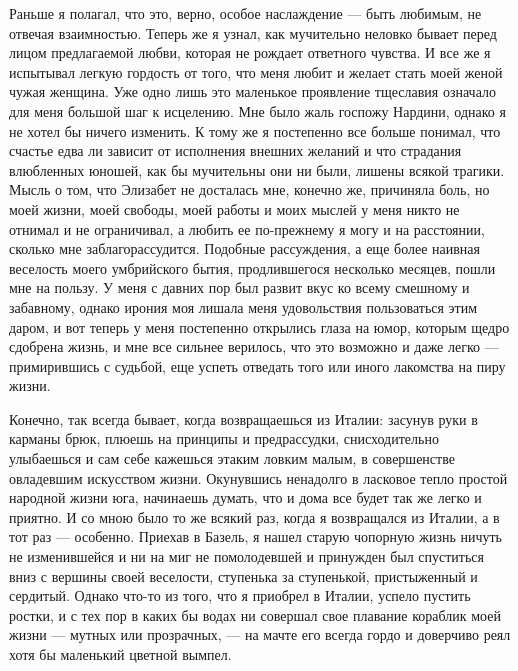 Раньше я полагал, что это, верно, особое наслаждение --- быть любимым,
не  отвечая взаимностью.  Теперь же  я узнал,  как мучительно  неловко
бывает перед  лицом предлагаемой  любви, которая не  рождает ответного
чувства. И все же я испытывал  легкую гордость от того, что меня любит
и желает стать  моей женой чужая женщина. Уже одно  лишь это маленькое
проявление тщеславия  означало для меня  большой шаг к  исцелению. Мне
было жаль  госпожу Нардини, однако  я не  хотел бы ничего  изменить. К
тому же я  постепенно все больше понимал, что счастье  едва ли зависит
от исполнения внешних  желаний и что страдания  влюбленных юношей, как
бы мучительны  они ни были,  лишены всякой  трагики. Мысль о  том, что
Элизабет не досталась мне, конечно  же, причиняла боль, но моей жизни,
моей свободы, моей работы  и моих мыслей у меня никто  не отнимал и не
ограничивал, а любить  ее по-прежнему я могу и  на расстоянии, сколько
мне  заблагорассудится.  Подобные  рассуждения, а  еще  более  наивная
веселость  моего умбрийского  бытия, продлившегося  несколько месяцев,
пошли мне  на пользу.  У меня с  давних пор был  развит вкус  ко всему
смешному  и  забавному, однако  ирония  моя  лишала меня  удовольствия
пользоваться  этим даром,  и вот  теперь у  меня постепенно  открылись
глаза  на  юмор, которым  щедро  сдобрена  жизнь,  и мне  все  сильнее
верилось, что  это возможно и  даже легко --- примирившись  с судьбой,
еще успеть отведать того или иного лакомства на пиру жизни.

Конечно,  так всегда  бывает, когда  возвращаешься из  Италии: засунув
руки в карманы брюк, плюешь на принципы и предрассудки, снисходительно
улыбаешься и  сам себе  кажешься этаким  ловким малым,  в совершенстве
овладевшим  искусством жизни.  Окунувшись ненадолго  в ласковое  тепло
простой народной жизни юга, начинаешь думать, что и дома все будет так
же  легко  и приятно.  И  со  мною было  то  же  всякий раз,  когда  я
возвращался из Италии,  а в тот раз --- особенно.  Приехав в Базель, я
нашел  старую  чопорную жизнь  ничуть  не  изменившейся  и ни  на  миг
не  помолодевшей  и принужден  был  спуститься  вниз с  вершины  своей
веселости, ступенька  за ступенькой,  пристыженный и  сердитый. Однако
что-то из  того, что я приобрел  в Италии, успело пустить  ростки, и с
тех пор в каких бы водах ни совершал свое плавание кораблик моей жизни
--- мутных или  прозрачных, --- на мачте его всегда  гордо и доверчиво
реял хотя бы маленький цветной вымпел.

